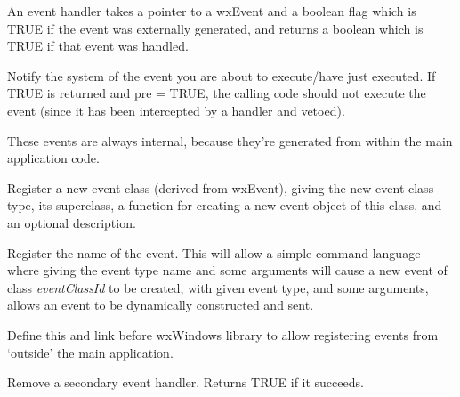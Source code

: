 An event handler takes a pointer to a wxEvent and a boolean flag which is
TRUE if the event was externally generated, and returns a boolean which is
TRUE if that event was handled.



Notify the system of the event you are about to execute/have just
executed.  If TRUE is returned and pre = TRUE, the calling code should
not execute the event (since it has been intercepted by a handler and
vetoed).

These events are always internal, because they're generated from within
the main application code.



Register a new event class (derived from wxEvent), giving the new
event class type, its superclass, a function for creating a new event
object of this class, and an optional description.



Register the name of the event. This will allow a simple command
language where giving the event type name and some arguments will
cause a new event of class {\it eventClassId} to be created, with given
event type, and some arguments, allows an event to be dynamically
constructed and sent.



Define this and link before wxWindows library to allow registering
events from `outside' the main application.



Remove a secondary event handler. Returns TRUE if it succeeds.

